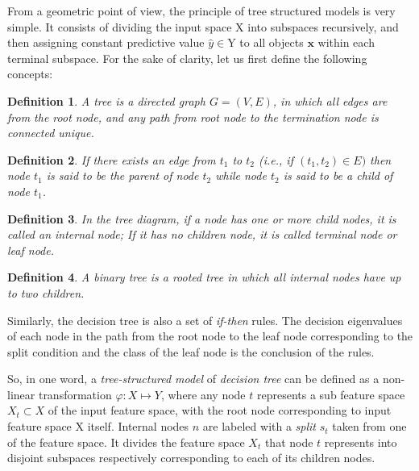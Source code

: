 \documentclass[master]{IPSstyle}
\newtheorem{definition}{Definition}
\begin{document}
{From a geometric point of view, the principle of tree structured models is very simple. It consists of dividing the input space $\mathrm{X}$ into subspaces recursively, and then assigning constant predictive value $\widehat{y}\in\mathrm{Y}$ to all objects $\mathbf{x}$ within each terminal subspace. For the sake of clarity, let us first define the following concepts:
\begin{definition}
A tree is a \emph{directed graph} $G=(V, E)$, in which all edges are from the root node, and any path from root node to the termination node is connected unique.
\end{definition}
\begin{definition}
If there exists an edge from $t_1$ to $t_2$ (i.e., if  $(t_1, t_2)\in E)$ then node $t_1$ is said to be the \emph{parent} of node $t_2$ while node $t_2$ is said to be a \emph{child} of node $t_1$.
\end{definition}
\begin{definition}
In the tree diagram, if a node has one or more child nodes, it is called an internal node; If it has no children node, it is called terminal node or leaf node.
\end{definition}
\begin{definition}
A \emph {binary tree} is a rooted tree in which all internal nodes have up to two children.
\end{definition}

Similarly, the decision tree is also a set of \emph{if-then} rules. The decision eigenvalues of each node in the path from the root node to the leaf node corresponding to the split condition and the class of the leaf node is the conclusion of the rules.

So, in one word, a \textit{tree-structured model} of \textit{decision tree} can be defined as a non-linear transformation $\varphi: X\mapsto Y$, where any node $t$ represents a sub feature space $X_t \subset X$ of the input feature space, with the root node corresponding to input feature space $\mathrm{X}$ itself. Internal nodes $n$ are labeled with a \textit{split} $s_t$ taken from one of the feature space. It divides the feature space $X_t$ that node $t$ represents into disjoint subspaces respectively corresponding to each of its children nodes. 

}
\end{document}
